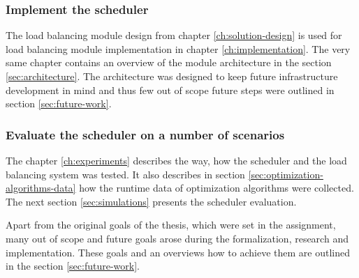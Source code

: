 \subsubsection{Implement the scheduler}
The load balancing module design from chapter \ref{ch:solution-design} is used for 
load balancing module implementation in chapter \ref{ch:implementation}.
The very same chapter contains an overview of the module architecture in the section \ref{sec:architecture}.
The architecture was designed to keep future infrastructure development in mind 
and thus few out of scope future steps were outlined in section \ref{sec:future-work}.

\subsubsection{Evaluate the scheduler on a number of scenarios}
The chapter \ref{ch:experiments} describes the way,
how the scheduler and the load balancing system was tested.
It also describes in section \ref{sec:optimization-algorithms-data} how the runtime data of optimization algorithms were collected.
The next section \ref{sec:simulations} presents the scheduler evaluation.

\bigskip \noindent
Apart from the original goals of the thesis,
which were set in the assignment,
many out of scope and future goals arose during the formalization, research and implementation.
These goals and an overviews how to achieve them are outlined in the section \ref{sec:future-work}.
